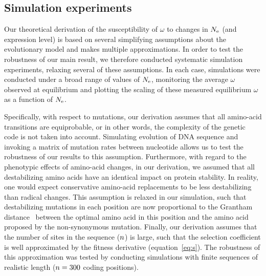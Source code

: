 \subsection{Simulation experiments}

Our theoretical derivation of the susceptibility of $\omega$ to changes in $N_{\text{e}}$ (and expression level) is based on several simplifying assumptions about the evolutionary model and makes multiple approximations.
In order to test the robustness of our main result, we therefore conducted systematic simulation experiments, relaxing several of these assumptions.
In each case, simulations were conducted under a broad range of values of $N_{\text{e}}$, monitoring the average $\omega$ observed at equilibrium and plotting the scaling of these measured equilibrium $\omega$ as a function of $N_{\text{e}}$.

Specifically, with respect to mutations, our derivation assumes that all amino-acid transitions are equiprobable, or in other words, the complexity of the genetic code is not taken into account.
Simulating evolution of \acrshort{DNA} sequence and invoking a matrix of mutation rates between nucleotide allows us to test the robustness of our results to this assumption.
Furthermore, with regard to the phenotypic effects of amino-acid changes, in our derivation, we assumed that all destabilizing amino acids have an identical impact on protein stability.
In reality, one would expect conservative amino-acid replacements to be less destabilizing than radical changes.
This assumption is relaxed in our simulation, such that destabilizing mutations in each position are now proportional to the Grantham distance~\citep{Grantham1974} between the optimal amino acid in this position and the amino acid proposed by the \gls{non-synonymous} mutation.
Finally, our derivation assumes that the number of sites in the sequence ($n$) is large, such that the selection coefficient is well approximated by the fitness derivative (equation~\ref{eq:s}).
The robustness of this approximation was tested by conducting simulations with finite sequences of realistic length ($n=300$ coding positions).

